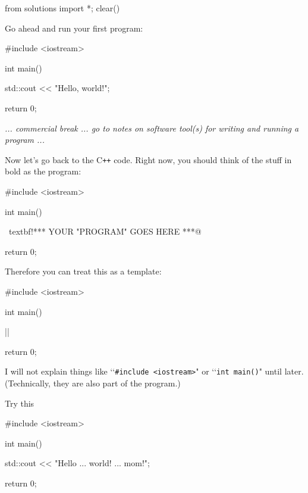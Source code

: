 \begin{python0}
from solutions import *; clear()
\end{python0}


Go ahead and run your first program:
\begin{console}
#include <iostream>

int main()
{
    std::cout << "Hello, world!\n";

    return 0;
}
\end{console}

\textit{ ... commercial break ... go to notes on software tool(s)
  for writing and running a program ...}

Now let's go back to the C\texttt{++} code.
Right now, you should think of the stuff in bold as the program:
\begin{console}[commandchars=\~\!\@]
#include <iostream>

int main()
{
    ~textbf!*** YOUR "PROGRAM" GOES HERE ***@

    return 0;
}
\end{console}

Therefore you can treat this as a template:
\begin{consolethree}[escapeinside=||]
#include <iostream>

int main()
{
                ||

    return 0;
}
\end{consolethree}

I will not explain things like 
\lq\lq \verb!#include <iostream>!" or 
\lq\lq \verb!int main()!" until later. 
(Technically, they are also part of  the program.)

Try this
\begin{console}
#include <iostream>

int main()
{
    std::cout << "Hello ... world! ... mom!\n";

    return 0;
}
\end{console}






